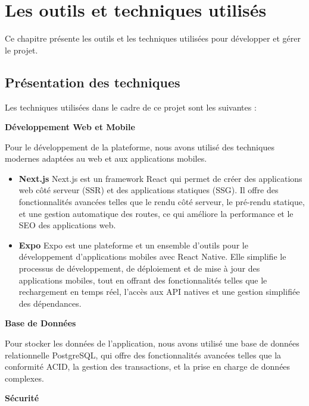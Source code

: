 \chapter{Les outils et techniques utilisés}
Ce chapitre présente les outils et les techniques utilisées pour développer
et gérer le projet.

\section{Présentation des techniques}
Les techniques utilisées dans le cadre de ce projet sont les suivantes :

  \textbf{ {Développement Web et Mobile}}

    Pour le développement de la plateforme, nous avons utilisé des techniques
    modernes adaptées au web et aux applications mobiles.
    \begin {itemize}
  \item \textbf{{Next.js}}
    Next.js est un framework React qui permet de créer des applications web côté
    serveur (SSR) et des applications statiques (SSG). Il offre des fonctionnalités
    avancées telles que le rendu côté serveur, le pré-rendu statique, et une
    gestion automatique des routes, ce qui améliore la performance et le
    SEO des applications web.

  \item \textbf{{Expo}}
    Expo est une plateforme et un ensemble d'outils pour le développement
    d'applications mobiles avec React Native. Elle simplifie le processus de
    développement, de déploiement et de mise à jour des applications mobiles,
    tout en offrant des fonctionnalités telles que le rechargement en temps réel,
    l'accès aux API natives et une gestion simplifiée des dépendances.

\end{itemize}

\textbf{{Base de Données}}

  Pour stocker les données de l'application, nous avons utilisé une base de
  données relationnelle PostgreSQL, qui offre des fonctionnalités avancées
  telles que la conformité ACID, la gestion des transactions, et la prise en
  charge de données complexes.

\textbf{{Sécurité}}

